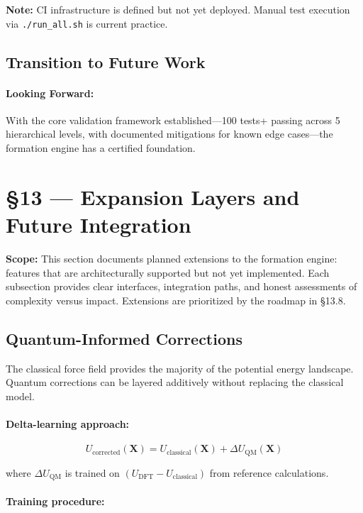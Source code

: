 \documentclass[11pt]{article}
\begin{document}
\textbf{Note:} CI infrastructure is defined but not yet deployed. Manual test execution via \texttt{./run\_all.sh} is current practice.

\subsection{Transition to Future Work}

\paragraph{Looking Forward:}

With the core validation framework established—100 tests+ passing across 5 hierarchical levels, with documented mitigations for known edge cases—the formation engine has a certified foundation.

\section{§13 — Expansion Layers and Future Integration}

\textbf{Scope:} This section documents planned extensions to the formation engine: features that are architecturally supported but not yet implemented. Each subsection provides clear interfaces, integration paths, and honest assessments of complexity versus impact. Extensions are prioritized by the roadmap in §13.8.

\subsection{Quantum-Informed Corrections}

The classical force field provides the majority of the potential energy landscape. Quantum corrections can be layered additively without replacing the classical model.

\paragraph{Delta-learning approach:}

\begin{equation}
U_{\text{corrected}}(\mathbf{X}) = U_{\text{classical}}(\mathbf{X}) + \Delta U_{\text{QM}}(\mathbf{X})
\end{equation}

where $\Delta U_{\text{QM}}$ is trained on $(U_{\text{DFT}} - U_{\text{classical}})$ from reference calculations.

\paragraph{Training procedure:}
\end{document}
